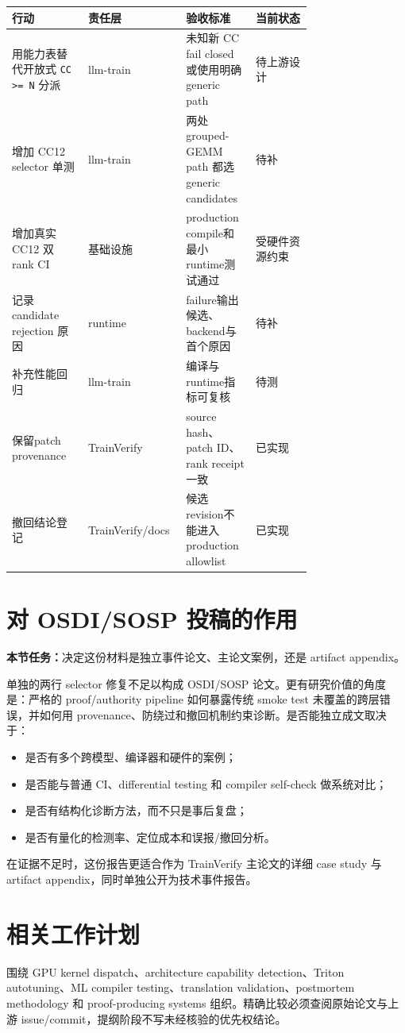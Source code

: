\documentclass[11pt,a4paper]{ctexart}
\newcommand{\contract}[1]{\par\smallskip\noindent\colorbox{light}{\parbox{0.95\linewidth}{\textbf{本节任务：}#1}}\par\smallskip}
\begin{document}
\begin{longtable}{p{0.23\linewidth}p{0.17\linewidth}p{0.18\linewidth}p{0.17\linewidth}}
\toprule
行动 & 责任层 & 验收标准 & 当前状态 \\
\midrule
用能力表替代开放式 \texttt{CC >= N} 分派 & llm-train & 未知新 CC fail closed 或使用明确generic path & 待上游设计 \\
增加 CC12 selector 单测 & llm-train & 两处 grouped-GEMM path 都选generic candidates & 待补 \\
增加真实 CC12 双 rank CI & 基础设施 & production compile和最小runtime测试通过 & 受硬件资源约束 \\
记录 candidate rejection 原因 & runtime & failure输出候选、backend与首个原因 & 待补 \\
补充性能回归 & llm-train & 编译与runtime指标可复核 & 待测 \\
保留patch provenance & TrainVerify & source hash、patch ID、rank receipt一致 & 已实现 \\
撤回结论登记 & TrainVerify/docs & 候选revision不能进入production allowlist & 已实现 \\
\bottomrule
\end{longtable}

\section{对 OSDI/SOSP 投稿的作用}
\contract{决定这份材料是独立事件论文、主论文案例，还是 artifact appendix。}

单独的两行 selector 修复不足以构成 OSDI/SOSP 论文。更有研究价值的角度是：严格的 proof/authority pipeline 如何暴露传统 smoke test 未覆盖的跨层错误，并如何用 provenance、防绕过和撤回机制约束诊断。是否能独立成文取决于：
\begin{itemize}
  \item 是否有多个跨模型、编译器和硬件的案例；
  \item 是否能与普通 CI、differential testing 和 compiler self-check 做系统对比；
  \item 是否有结构化诊断方法，而不只是事后复盘；
  \item 是否有量化的检测率、定位成本和误报/撤回分析。
\end{itemize}

在证据不足时，这份报告更适合作为 TrainVerify 主论文的详细 case study 与 artifact appendix，同时单独公开为技术事件报告。

\section{相关工作计划}
围绕 GPU kernel dispatch、architecture capability detection、Triton autotuning、ML compiler testing、translation validation、postmortem methodology 和 proof-producing systems 组织。精确比较必须查阅原始论文与上游 issue/commit，提纲阶段不写未经核验的优先权结论。
\end{document}
